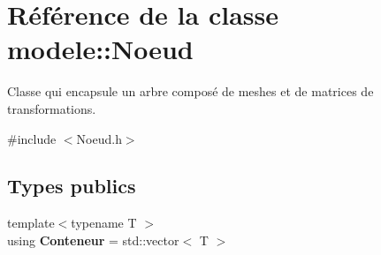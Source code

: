 \hypertarget{classmodele_1_1_noeud}{\section{Référence de la classe modele\-:\-:Noeud}
\label{classmodele_1_1_noeud}
}


Classe qui encapsule un arbre composé de meshes et de matrices de transformations.  




{\ttfamily \#include $<$Noeud.\-h$>$}

\subsection*{Types publics}
\begin{DoxyCompactItemize}
\item 
\hypertarget{classmodele_1_1_noeud_aebc16c98cd928d1cc3167c8bbffc1d40}{{\footnotesize template$<$typename T $>$ }\\using {\bfseries Conteneur} = std\-::vector$<$ T $>$}\label{classmodele_1_1_noeud_aebc16c98cd928d1cc3167c8bbffc1d40}

\end{DoxyCompactItemize}
